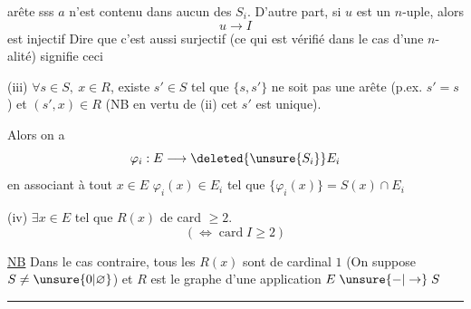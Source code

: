 arête sss $a$ n'est contenu dans aucun
des $S_i$. D'autre part, si $u$ est un
$n$-uple, alors
\[
u\longrightarrow I
\]
est injectif  Dire que c'est aussi surjectif
(ce qui est vérifié dans le cas d'une $n$-alité)
signifie ceci

(iii) $\forall s\in S,\ x\in R$, existe $s'\in S$ tel que
$\{s,s'\}$ ne soit pas une arête (p.ex. $s'=s$) et $(s',x)\in R$
(NB en vertu de (ii) cet $s'$ est unique).

Alors on a
\[
\varphi_i:E\longrightarrow\deleted{\unsure{S_i}}E_i
\]
en associant à tout $x\in E$ 
 $\varphi_i(x)\in E_i$ tel que $\{\varphi_i(x)\}=S(x)\cap E_i$

(iv)  $\exists x\in E$ tel que $R(x)$ de card $\geq2$.
\[
(\Longleftrightarrow\operatorname{card}I\geq2)
\]

\uline{NB} Dans le cas contraire, tous les $R(x)$
sont de cardinal $1$ (On suppose $S\ne\unsure{0|\varnothing}$)
et $R$ est le graphe d'une
application $E\mathrel{\unsure{-|\to}}S$

\begin{center}\rule{1.2cm}{.6pt}\end{center}
